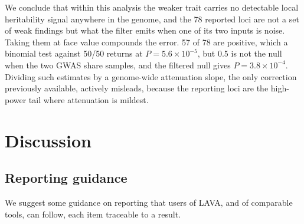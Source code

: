 \documentclass[12pt,a4paper]{article}
\begin{document}
We conclude that within this analysis the weaker
trait carries no detectable local heritability signal anywhere in the genome, and the 78
reported loci are not a set of weak findings but what the filter emits when one of its two
inputs is noise. Taking them at face value compounds the error. 57 of 78 are positive,
which a binomial test against 50/50 returns at $P=5.6\times10^{-5}$, but 0.5 is not the
null when the two GWAS share samples, and the filtered null gives $P=3.8\times10^{-4}$.
Dividing such estimates by a genome-wide attenuation slope, the only correction
previously available, actively misleads, because the reporting loci are the high-power
tail where attenuation is mildest.

\section{Discussion}\label{sec:discussion}

\subsection{Reporting guidance}\label{sec:guidance}

We suggest some guidance on reporting that users of LAVA, and of comparable tools, can
follow, each item traceable to a result.
\end{document}
